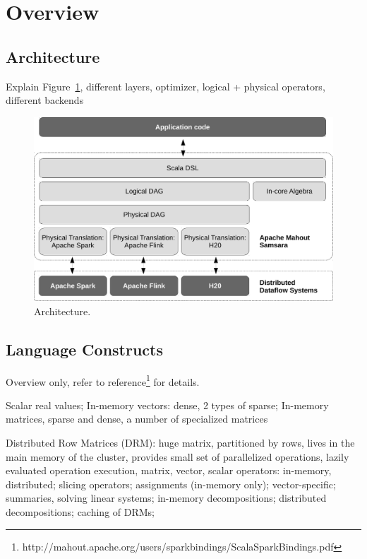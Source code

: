 \documentclass{article}
\begin{document}
\section{Overview}

\subsection{Architecture}


Explain Figure~\ref{fig:architecture}, different layers, optimizer, logical + physical operators, different backends

\begin{figure}
  \centering
  \includegraphics[scale=.5]{figures/architecture-crop}
  \caption{Architecture.}
  \label{fig:architecture}
\end{figure}

\subsection{Language Constructs}

Overview only, refer to reference\footnote{http://mahout.apache.org/users/sparkbindings/ScalaSparkBindings.pdf} for details.

Scalar real values; In-memory vectors: dense, 2 types of sparse; In-memory matrices, sparse and dense, a number of specialized matrices

Distributed Row Matrices (DRM): huge matrix, partitioned by rows, lives in the main memory of the cluster, provides small set of parallelized operations, lazily evaluated operation execution, matrix, vector, scalar operators: in-memory, distributed; slicing operators; assignments (in-memory only); vector-specific; summaries, solving linear systems; in-memory decompositions; distributed decompositions; caching of DRMs;
\end{document}
